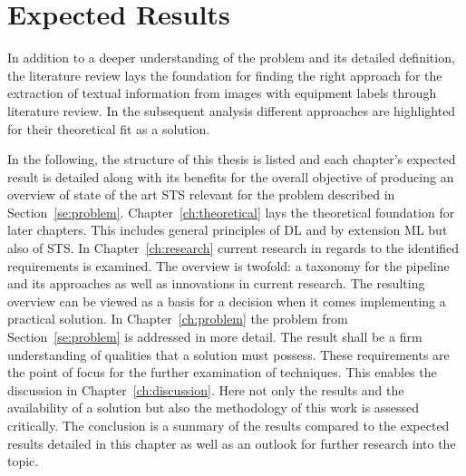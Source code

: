 \section{Expected Results}
In addition to a deeper understanding of the problem and its detailed definition, the literature
review lays the foundation for finding the right approach for the extraction of textual
information from images with equipment labels through literature review.
In the subsequent analysis different approaches are highlighted for their theoretical fit as a solution.

In the following, the structure of this thesis is listed and each chapter's expected
result is detailed along with its benefits for the overall objective of producing an overview of
state of the art \ac{STS} relevant for the problem described in Section~\ref{se:problem}.
Chapter~\ref{ch:theoretical} lays the theoretical foundation for later chapters.
This includes general principles of \ac{DL} and by extension \ac{ML} but also of \ac{STS}.
In Chapter~\ref{ch:research} current research in regards to the
identified requirements is examined.
The overview is twofold: a taxonomy for the pipeline and its approaches as well as innovations in
current research.
The resulting overview can be viewed as a basis for a decision when it comes implementing a practical
solution.
In Chapter~\ref{ch:problem} the problem from Section~\ref{se:problem} is addressed in more detail.
The result shall be a firm understanding of qualities that a solution must possess.
These requirements are the point of focus for the further examination of techniques.
This enables the discussion in Chapter~\ref{ch:discussion}.
Here not only the results and the availability of a solution but also the methodology of this work
is assessed critically.
The conclusion is a summary of the results compared to the expected results detailed in this chapter
as well as an outlook for further research into the topic.
